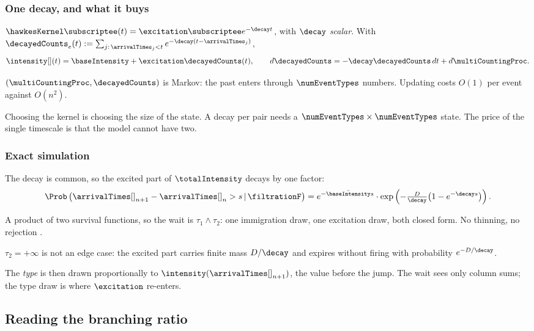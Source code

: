\begin{frame}
  \frametitle{One decay, and what it buys}
$\hawkesKernel\subscriptee(t) = \excitation\subscriptee e^{-\decay t}$,
with $\decay$ \emph{scalar}.
With
$\decayedCounts_e(t) := \sum_{j:\, \arrivalTimes_{j} < t} e^{-\decay(t-\arrivalTimes_{j})}$,
\begin{equation*}
 \intensity[ ](t) = \baseIntensity + \excitation \decayedCounts(t),
 \qquad
 d\decayedCounts = -\decay \decayedCounts \, dt + d\multiCountingProc .
\end{equation*}

$(\multiCountingProc, \decayedCounts)$ is Markov: the past enters through $\numEventTypes$
numbers. Updating costs $O(1)$ per event against $O(n^2)$.

Choosing the kernel is choosing the size of the state.
A decay per pair needs a $\numEventTypes \times \numEventTypes$ state.
The price of the single timescale is that the model cannot have two.
\end{frame}

\begin{frame}
  \frametitle{Exact simulation}
The decay is common, so the excited part of $\totalIntensity$ decays by one factor:
\begin{equation*}
 \Prob \left( \arrivalTimes[]_{n+1} - \arrivalTimes[]_{n} > s \, \vert \, \filtrationF \right)
 = e^{-\bar{\baseIntensity}s} \cdot
 \exp\left( -\tfrac{D}{\decay}\big(1 - e^{-\decay s}\big) \right) .
\end{equation*}

A product of two survival functions, so the wait is $\tau_1 \wedge \tau_2$:
one immigration draw, one excitation draw, both closed form.
No thinning, no rejection \citep{DZ13exa}.

$\tau_2 = +\infty$ is not an edge case:
the excited part carries finite mass $D/\decay$ and expires without firing with probability
$e^{-D/\decay}$.

The \emph{type} is then drawn proportionally to $\intensity(\arrivalTimes[]_{n+1})$, the value before the jump.
The wait sees only column sums; the type draw is where $\excitation$ re-enters.
\end{frame}

\subsection{Reading the branching ratio}

